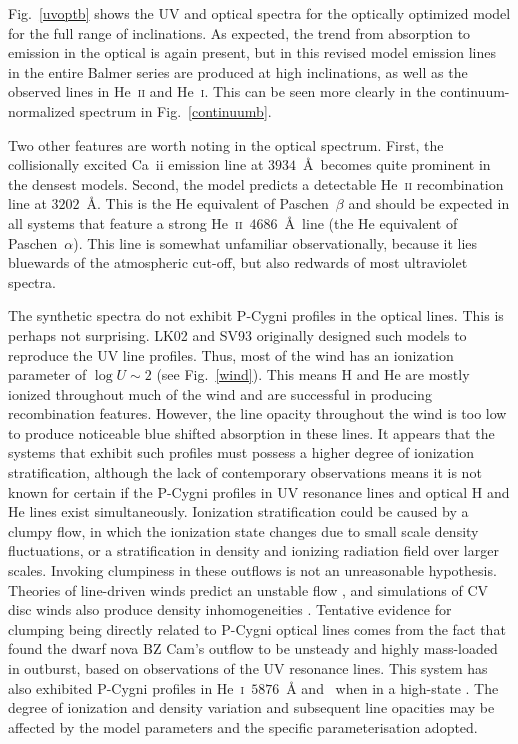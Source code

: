 Fig.~\ref{uvoptb} shows the UV and optical spectra for the
optically optimized model for the full range of inclinations. 
As expected, the trend from absorption to emission 
in the optical is again present, but in this revised model emission
lines in the entire Balmer series are produced at high inclinations, as well
as the observed lines 
in He~\textsc{ii} and He~\textsc{i}. This can be seen more clearly in the 
continuum-normalized spectrum in Fig.~\ref{continuumb}.

Two other features are worth noting in the optical
spectrum. First, the collisionally excited Ca~{\sc ii} emission line at $3934$~\AA\ 
becomes quite prominent in the densest models. Second, the model predicts a detectable
He~\textsc{ii} recombination line at $3202$~\AA. This is the He
equivalent of Paschen~$\beta$ and should be expected in all systems that
feature a strong He~\textsc{ii}~$4686$~\AA\ line (the He
equivalent of Paschen~$\alpha$). 
This line is somewhat unfamiliar observationally, because it 
lies bluewards of the atmospheric cut-off, but
also redwards of most ultraviolet spectra. 

The synthetic spectra do not exhibit P-Cygni profiles in the optical lines.
This is perhaps not surprising. LK02 and SV93 originally designed such models
to reproduce the UV line profiles. Thus, most of the wind
has an ionization parameter of $\log U \sim 2$ (see Fig.~\ref{wind}).
This means H and He are mostly ionized throughout 
much of the wind and are successful in producing recombination features.
However, the line opacity throughout the wind is too
low to produce noticeable blue shifted absorption in these lines. 
It appears that the systems that exhibit such profiles must 
possess a higher degree of ionization stratification, although the lack 
of contemporary observations means it is not known for certain if the 
P-Cygni profiles in UV resonance lines and optical H and He lines exist simultaneously.
Ionization stratification could be caused by a clumpy flow, in which the 
ionization state 
changes due to small scale density fluctuations, or a stratification in density
and ionizing radiation field over larger scales.
Invoking clumpiness in these outflows is not an unreasonable
hypothesis. Theories of line-driven winds predict an unstable flow
\citep{macgregor1979,owockirybicki1984,owockirybicki1985}, and
simulations of CV disc winds also produce density inhomogeneities 
\citep{proga1998,pkdh2002}.
Tentative evidence for clumping being directly related to P-Cygni optical lines
comes from the fact that \cite{prinja2000}
found the dwarf nova BZ Cam's outflow to be unsteady and highly mass-loaded in outburst,
based on observations of the UV resonance lines.
This system has also exhibited P-Cygni profiles in He~\textsc{i}~$5876$~\AA
and \ha\ when in a high-state \citep{patterson1996,RN98}. 
The degree of ionization and density variation and 
subsequent line opacities may be affected by the model parameters
and the specific parameterisation adopted.

